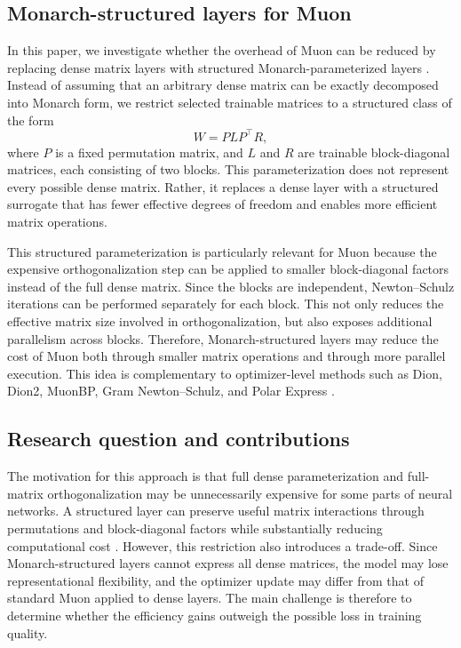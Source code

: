 \documentclass{article}
\begin{document}
\subsection{Monarch-structured layers for Muon}

In this paper, we investigate whether the overhead of Muon can be reduced by replacing dense matrix layers with structured Monarch-parameterized layers \cite{dao2022monarchexpressivestructuredmatrices}. Instead of assuming that an arbitrary dense matrix can be exactly decomposed into Monarch form, we restrict selected trainable matrices to a structured class of the form
\[
W = P L P^\top R,
\]
where \(P\) is a fixed permutation matrix, and \(L\) and \(R\) are trainable block-diagonal matrices, each consisting of two blocks. This parameterization does not represent every possible dense matrix. Rather, it replaces a dense layer with a structured surrogate that has fewer effective degrees of freedom and enables more efficient matrix operations.

This structured parameterization is particularly relevant for Muon because the expensive orthogonalization step can be applied to smaller block-diagonal factors instead of the full dense matrix. Since the blocks are independent, Newton--Schulz iterations can be performed separately for each block. This not only reduces the effective matrix size involved in orthogonalization, but also exposes additional parallelism across blocks. Therefore, Monarch-structured layers may reduce the cost of Muon both through smaller matrix operations and through more parallel execution. This idea is complementary to optimizer-level methods such as Dion, Dion2, MuonBP, Gram Newton--Schulz, and Polar Express \cite{ahn2025diondistributedorthonormalizedupdates,ahn2025dion2simplemethodshrink,khaled2025muonbpfastermuonblockperiodic,GramNewtonSchulz,amsel2026polarexpressoptimalmatrix}.

\subsection{Research question and contributions}

The motivation for this approach is that full dense parameterization and full-matrix orthogonalization may be unnecessarily expensive for some parts of neural networks. A structured layer can preserve useful matrix interactions through permutations and block-diagonal factors while substantially reducing computational cost \cite{dao2022monarchexpressivestructuredmatrices}. However, this restriction also introduces a trade-off. Since Monarch-structured layers cannot express all dense matrices, the model may lose representational flexibility, and the optimizer update may differ from that of standard Muon applied to dense layers. The main challenge is therefore to determine whether the efficiency gains outweigh the possible loss in training quality.
\end{document}
